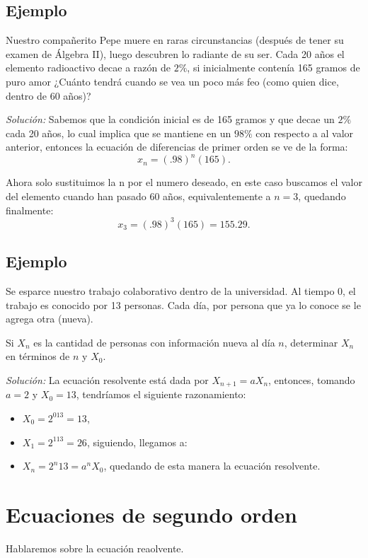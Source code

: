 \documentclass{article}
\begin{document}
\subsection{Ejemplo}

Nuestro compañerito Pepe muere en raras circunstancias (después de
tener su examen de Álgebra II), luego descubren lo radiante de su
ser. Cada 20 años el elemento radioactivo decae a razón de $2\%$, si
inicialmente contenía 165 gramos de puro amor ¿Cuánto tendrá cuando se
vea un poco más feo (como quien dice, dentro de 60 años)?

\textit{Solución:}  
Sabemos que la condición inicial es de 165 gramos y que decae un $2\%$
cada 20 años, lo cual implica que se mantiene en un $98\%$ con
respecto a al valor anterior, entonces la ecuación de diferencias de
primer orden se ve de la forma:
$$x_{n}=(.98)^n(165).$$

Ahora solo sustituimos la n por el numero deseado, en este caso
buscamos el valor del elemento cuando han pasado 60 años,
equivalentemente a $n=3$, quedando finalmente:
$$x_{3}=(.98)^3(165)= 155.29.$$

\subsection{Ejemplo}

Se esparce nuestro trabajo colaborativo dentro de la universidad. Al
tiempo 0, el trabajo es conocido por 13 personas. Cada día, por
persona que ya lo conoce se le agrega otra (nueva).

Si $X_n$ es la cantidad de personas con información nueva al día $n$,
determinar $X_n$ en términos de $n$ y $X_0$.

\textit{Solución:} La ecuación resolvente está dada por
$X_{n+1}=aX_n$, entonces, tomando $a=2$ y $X_0=13$, tendríamos el
siguiente razonamiento:
\begin{itemize}
\item $X_0=2^013=13$,
\item $X_1=2^113=26$, siguiendo, llegamos a:
\item $X_n=2^n13=a^nX_0$, quedando de esta manera la ecuación resolvente.
\end{itemize}

\section{Ecuaciones de segundo orden}

Hablaremos sobre la ecuación reaolvente.
\end{document}
